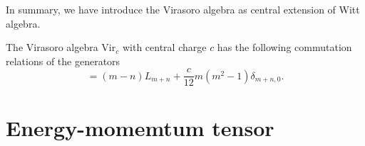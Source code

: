 \documentclass[graybox,envcountchap,sectrefs]{svmono}
\begin{document}
In summary, we have introduce the Virasoro algebra as central extension of Witt algebra.
\begin{svgraybox}
\begin{definition}
		The Virasoro algebra $\mathrm{Vir}_c$ with central charge $c$ has the following commutation relations of the generators
	\begin{equation}
	[L_m,L_n]=(m-n)L_{m+n}+\frac{c}{12}m(m^2-1)\delta_{m+n,0}.
	\end{equation}
\end{definition}
\end{svgraybox}



\section{Energy-momemtum tensor}
\end{document}
